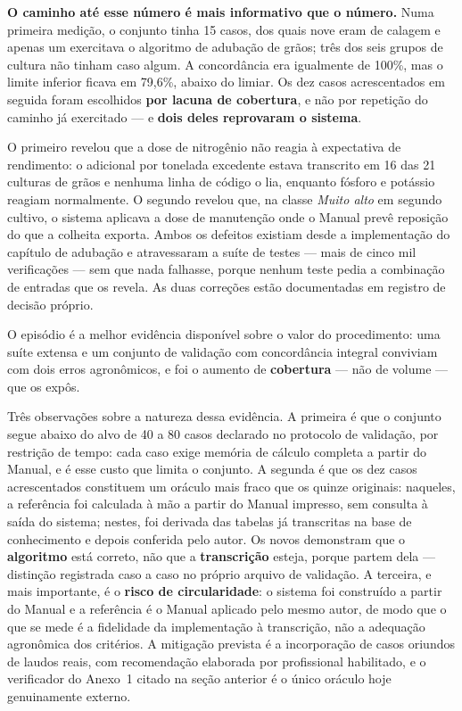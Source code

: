 \textbf{O caminho até esse número é mais informativo que o número.} Numa primeira medição,
o conjunto tinha 15 casos, dos quais nove eram de calagem e apenas um exercitava o
algoritmo de adubação de grãos; três dos seis grupos de cultura não tinham caso algum. A
concordância era igualmente de 100\%, mas o limite inferior ficava em 79,6\%, abaixo do
limiar. Os dez casos acrescentados em seguida foram escolhidos \textbf{por lacuna de
cobertura}, e não por repetição do caminho já exercitado --- e \textbf{dois deles
reprovaram o sistema}.

O primeiro revelou que a dose de nitrogênio não reagia à expectativa de rendimento: o
adicional por tonelada excedente estava transcrito em 16 das 21 culturas de grãos e
nenhuma linha de código o lia, enquanto fósforo e potássio reagiam normalmente. O segundo
revelou que, na classe \textit{Muito alto} em segundo cultivo, o sistema aplicava a dose
de manutenção onde o Manual prevê reposição do que a colheita exporta. Ambos os defeitos
existiam desde a implementação do capítulo de adubação e atravessaram a suíte de
testes --- mais de cinco mil verificações --- sem que nada falhasse, porque nenhum teste
pedia a combinação de entradas que os revela. As duas correções estão documentadas em
registro de decisão próprio.

O episódio é a melhor evidência disponível sobre o valor do procedimento: uma suíte
extensa e um conjunto de validação com concordância integral conviviam com dois erros
agronômicos, e foi o aumento de \textbf{cobertura} --- não de volume --- que os expôs.

Três observações sobre a natureza dessa evidência. A primeira é que o conjunto segue
abaixo do alvo de 40 a 80 casos declarado no protocolo de validação, por restrição de
tempo: cada caso exige memória de cálculo completa a partir do Manual, e é esse custo que
limita o conjunto. A segunda é que os dez casos acrescentados constituem um oráculo mais
fraco que os quinze originais: naqueles, a referência foi calculada à mão a partir do
Manual impresso, sem consulta à saída do sistema; nestes, foi derivada das tabelas já
transcritas na base de conhecimento e depois conferida pelo autor. Os novos demonstram
que o \textbf{algoritmo} está correto, não que a \textbf{transcrição} esteja, porque
partem dela --- distinção registrada caso a caso no próprio arquivo de validação. A
terceira, e mais importante, é o \textbf{risco de circularidade}: o sistema foi construído
a partir do Manual e a referência é o Manual aplicado pelo mesmo autor, de modo que o que
se mede é a fidelidade da implementação à transcrição, não a adequação agronômica dos
critérios. A mitigação prevista é a incorporação de casos oriundos de laudos reais, com
recomendação elaborada por profissional habilitado, e o verificador do Anexo~1 citado na
seção anterior é o único oráculo hoje genuinamente externo.


